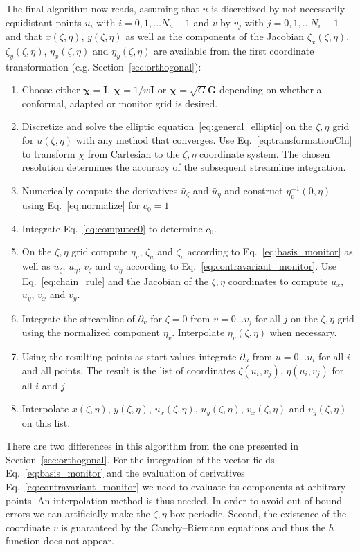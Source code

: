 \documentclass{hitec} %
\renewcommand{\vec}[1]{{\mathbf{#1}}}
\begin{document}
The final algorithm now reads, assuming that $u$ is discretized
by not necessarily equidistant points $u_i$ with $i=0,1,\dots N_u-1$ and 
$v$ by $v_j$ with $j=0,1,\dots N_v-1$ and that $x(\zeta,\eta)$, $y(\zeta, \eta)$
as well as the components of the Jacobian $\zeta_x(\zeta,\eta)$, $\zeta_y(\zeta,\eta)$, $\eta_x(\zeta,\eta)$ and $\eta_y(\zeta,\eta)$ are available from the first coordinate transformation (e.g. Section~\ref{sec:orthogonal}):
\begin{enumerate}
  \item Choose either $\vec \chi = \vec I$, $\vec \chi=1/w\vec I$ or $\vec \chi = \sqrt{G}\vec G$ depending on whether a conformal, adapted or monitor grid is desired.
  \item Discretize and solve the elliptic equation~\eqref{eq:general_elliptic} on the $\zeta,\eta$ grid for $\bar u(\zeta, \eta)$ with any
    method that converges.  
    Use Eq.~\eqref{eq:transformationChi} to transform $\chi$ from Cartesian 
    to the $\zeta, \eta$ coordinate system.
    The chosen resolution
    determines the accuracy of the subsequent streamline integration.
  \item Numerically compute the derivatives $\bar u_\zeta$ and $\bar u_\eta$ 
    and construct $\eta_v^{-1}(0, \eta)$ using Eq.~\eqref{eq:normalize} for $c_0=1$
  \item Integrate Eq.~\eqref{eq:computec0} to determine $c_0$.
  \item On the $\zeta, \eta$ grid compute $\eta_v$, $\zeta_u$ and $\zeta_v$ according to Eq.~\eqref{eq:basis_monitor} as well as $u_\zeta$, $u_\eta$, $v_\zeta$ and
    $v_\eta$ according to Eq.~\eqref{eq:contravariant_monitor}. Use Eq.~\eqref{eq:chain_rule} and the Jacobian of the $\zeta, \eta$ coordinates to compute $u_x$, $u_y$, $v_x$ and $v_y$.
  \item Integrate the streamline of $\partial_v$ for $\zeta=0$ 
    from $v=0\dots v_j$ for all $j$ on the $\zeta, \eta$ grid using the normalized component $\eta_v$. 
    Interpolate $\eta_v(\zeta, \eta)$ when necessary.
  \item Using the resulting points as start values integrate $\partial_u$ from 
    $u=0\dots u_i$ for all $i$ and all points. The result is the list
    of coordinates $\zeta(u_i, v_j)$, $\eta(u_i, v_j)$ for all $i$ and $j$.
  \item Interpolate $x\left( \zeta,\eta \right)$, $y\left( \zeta, \eta \right)$, 
    $u_x(\zeta, \eta)$, $u_y(\zeta, \eta)$, $v_x(\zeta, \eta)$ and $v_y(\zeta, \eta)$ on this list. 
\end{enumerate}
There are two differences in this algorithm from the one presented in 
Section~\ref{sec:orthogonal}.
For the integration of the vector fields Eq.~\eqref{eq:basis_monitor} and the evaluation of derivatives Eq.~\eqref{eq:contravariant_monitor} we need to evaluate its components at arbitrary points.
An interpolation method is thus needed. 
In order to avoid out-of-bound errors we can artificially make the $\zeta,\eta$ box periodic.
Second, the existence of the coordinate $v$ is guaranteed by the Cauchy--Riemann equations
and thus the $h$ function does not appear. 
\end{document}
